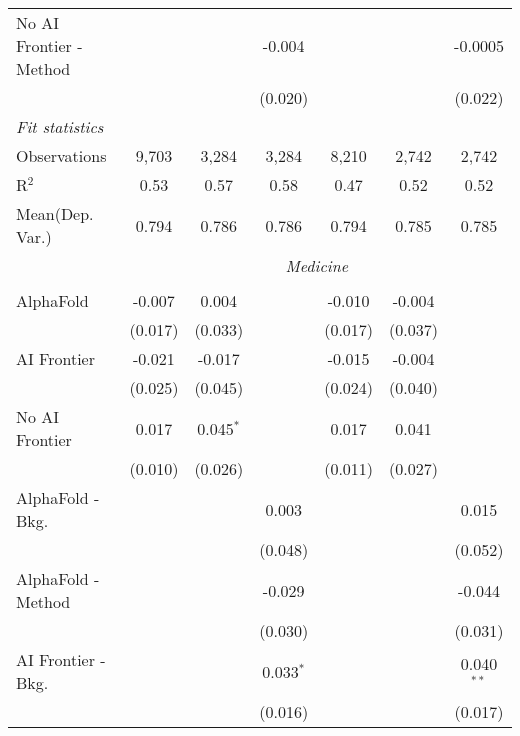 \begin{tabular}{lcccccc}
   No AI Frontier - Method &                &              & -0.004        &                &               & -0.0005\\   
                           &                &              & (0.020)       &                &               & (0.022)\\   
   \midrule
   \emph{Fit statistics}\\
   Observations            & 9,703          & 3,284        & 3,284         & 8,210          & 2,742         & 2,742\\  
   R$^2$                   & 0.53           & 0.57         & 0.58          & 0.47           & 0.52          & 0.52\\  
   
Mean(Dep. Var.) & 0.794 & 0.786 & 0.786 & 0.794 & 0.785 & 0.785 \\
 & \multicolumn{6}{c}{\textit{Medicine}} \\ \\
   AlphaFold               & -0.007  & 0.004       &              & -0.010  & -0.004  &   \\   
                           & (0.017) & (0.033)     &              & (0.017) & (0.037) &   \\   
   AI Frontier             & -0.021  & -0.017      &              & -0.015  & -0.004  &   \\   
                           & (0.025) & (0.045)     &              & (0.024) & (0.040) &   \\   
   No AI Frontier          & 0.017   & 0.045$^{*}$ &              & 0.017   & 0.041   &   \\   
                           & (0.010) & (0.026)     &              & (0.011) & (0.027) &   \\   
   AlphaFold - Bkg.        &         &             & 0.003        &         &         & 0.015\\   
                           &         &             & (0.048)      &         &         & (0.052)\\   
   AlphaFold - Method      &         &             & -0.029       &         &         & -0.044\\   
                           &         &             & (0.030)      &         &         & (0.031)\\   
   AI Frontier - Bkg.      &         &             & 0.033$^{*}$  &         &         & 0.040$^{**}$\\   
                           &         &             & (0.016)      &         &         & (0.017)\\   

\end{tabular}

